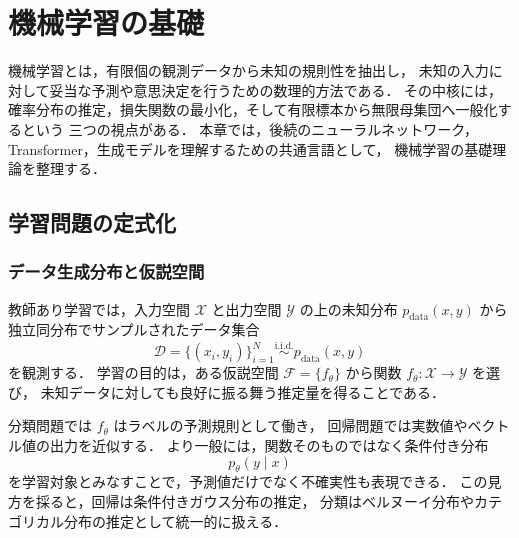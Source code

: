 
\chapter{機械学習の基礎}
\label{chap:ml-basics}

機械学習とは，有限個の観測データから未知の規則性を抽出し，
未知の入力に対して妥当な予測や意思決定を行うための数理的方法である．
その中核には，確率分布の推定，損失関数の最小化，そして有限標本から無限母集団へ一般化するという
三つの視点がある．
本章では，後続のニューラルネットワーク，Transformer，生成モデルを理解するための共通言語として，
機械学習の基礎理論を整理する\cite{Bishop2006,Murphy2012,Goodfellow2016}．

\section{学習問題の定式化}
\label{sec:ml-formulation}

\subsection{データ生成分布と仮説空間}

教師あり学習では，入力空間 $\mathcal{X}$ と出力空間 $\mathcal{Y}$ の上の未知分布
$p_{\mathrm{data}}(x,y)$ から独立同分布でサンプルされたデータ集合
\begin{equation}
  \mathcal{D} = \{(x_i, y_i)\}_{i=1}^{N}
  \overset{\mathrm{i.i.d.}}{\sim} p_{\mathrm{data}}(x,y)
  \label{eq:dataset}
\end{equation}
を観測する．
学習の目的は，ある仮説空間 $\mathcal{F} = \{f_{\theta}\}$ から関数
$f_{\theta} : \mathcal{X} \to \mathcal{Y}$ を選び，
未知データに対しても良好に振る舞う推定量を得ることである．

分類問題では $f_{\theta}$ はラベルの予測規則として働き，
回帰問題では実数値やベクトル値の出力を近似する．
より一般には，関数そのものではなく条件付き分布
\begin{equation}
  p_{\theta}(y \mid x)
\end{equation}
を学習対象とみなすことで，予測値だけでなく不確実性も表現できる．
この見方を採ると，回帰は条件付きガウス分布の推定，
分類はベルヌーイ分布やカテゴリカル分布の推定として統一的に扱える．

